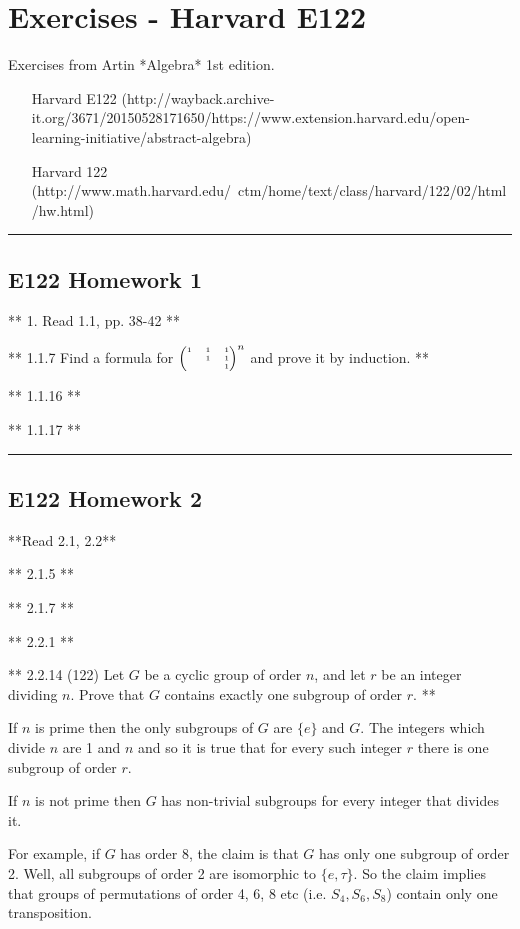 \section{Exercises - Harvard E122}
Exercises from Artin *Algebra* 1st edition.

\begin{itemize}
\item [Harvard E122](http://wayback.archive-it.org/3671/20150528171650/https://www.extension.harvard.edu/open-learning-initiative/abstract-algebra)
\item [Harvard 122](http://www.math.harvard.edu/~ctm/home/text/class/harvard/122/02/html/hw.html)
\end{itemize}

\hrule

\subsection{E122 Homework 1}

** 1. Read 1.1, pp. 38-42 **

** 1.1.7 Find a formula for $\tiny{\begin{pmatrix}1 & 1 & 1\\  & 1 & 1\\  &   & 1\\ \end{pmatrix}}^n$ and prove it by induction. **

** 1.1.16 **

** 1.1.17 **

\hrule
\subsection{E122 Homework 2}
**Read 2.1, 2.2**

** 2.1.5 **

** 2.1.7 **

** 2.2.1 **

** 2.2.14 (122) Let $G$ be a cyclic group of order $n$, and let $r$ be an integer
dividing $n$. Prove that $G$ contains exactly one subgroup of order $r$. **

If $n$ is prime then the only subgroups of $G$ are $\{e\}$ and $G$. The
integers which divide $n$ are 1 and $n$ and so it is true that for every such
integer $r$ there is one subgroup of order $r$.

If $n$ is not prime then $G$ has non-trivial subgroups for every integer that
divides it.

For example, if $G$ has order 8, the claim is that $G$ has only one subgroup of
order 2. Well, all subgroups of order 2 are isomorphic to $\{e, \tau\}$. So the
claim implies that groups of permutations of order 4, 6, 8 etc (i.e. $S_4, S_6,
S_8$) contain only one transposition.


